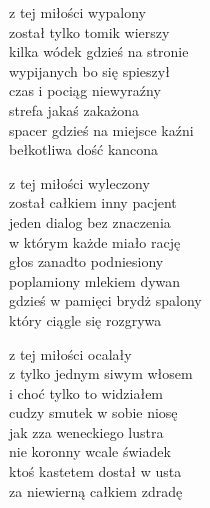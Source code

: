 \begin{text}
    z tej miłości wypalony\\
    został tylko tomik wierszy\\
    kilka wódek gdzieś na stronie\\
    wypijanych bo się spieszył\\
    czas i pociąg niewyraźny\\
    strefa jakaś zakażona\\
    spacer gdzieś na miejsce kaźni\\
    bełkotliwa dość kancona

    z tej miłości wyleczony\\
    został całkiem inny pacjent\\
    jeden dialog bez znaczenia\\
    w którym każde miało rację\\
    głos zanadto podniesiony\\
    poplamiony mlekiem dywan\\
    gdzieś w pamięci brydż spalony\\
    który ciągle się rozgrywa

    z tej miłości ocalały\\
    z tylko jednym siwym włosem\\
    i choć tylko to widziałem\\
    cudzy smutek w sobie niosę\\
    jak zza weneckiego lustra\\
    nie koronny wcale świadek\\
    ktoś kastetem dostał w usta\\
    za niewierną całkiem zdradę
\end{text}
\begin{chord}

\end{chord}